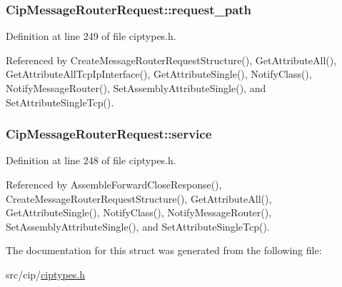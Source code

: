 \hypertarget{structCipMessageRouterRequest_ad77c58ca6a008b6dc0fdef151ebb7a8e}{
\subsubsection[{request\-\_\-path}]{ {\bf \-Cip\-Message\-Router\-Request\-::request\-\_\-path}}}\label{dc/d16/structCipMessageRouterRequest_ad77c58ca6a008b6dc0fdef151ebb7a8e}


\-Definition at line 249 of file ciptypes.\-h.



\-Referenced by \-Create\-Message\-Router\-Request\-Structure(), \-Get\-Attribute\-All(), \-Get\-Attribute\-All\-Tcp\-Ip\-Interface(), \-Get\-Attribute\-Single(), \-Notify\-Class(), \-Notify\-Message\-Router(), \-Set\-Assembly\-Attribute\-Single(), and \-Set\-Attribute\-Single\-Tcp().

\hypertarget{structCipMessageRouterRequest_a73850f4495f33d0b2a9957a830b8b40f}{
\subsubsection[{service}]{ {\bf \-Cip\-Message\-Router\-Request\-::service}}}\label{dc/d16/structCipMessageRouterRequest_a73850f4495f33d0b2a9957a830b8b40f}


\-Definition at line 248 of file ciptypes.\-h.



\-Referenced by \-Assemble\-Forward\-Close\-Response(), \-Create\-Message\-Router\-Request\-Structure(), \-Get\-Attribute\-All(), \-Get\-Attribute\-Single(), \-Notify\-Class(), \-Notify\-Message\-Router(), \-Set\-Assembly\-Attribute\-Single(), and \-Set\-Attribute\-Single\-Tcp().



\-The documentation for this struct was generated from the following file\-:\begin{DoxyCompactItemize}
\item 
src/cip/\hyperlink{ciptypes_8h}{ciptypes.\-h}\end{DoxyCompactItemize}
